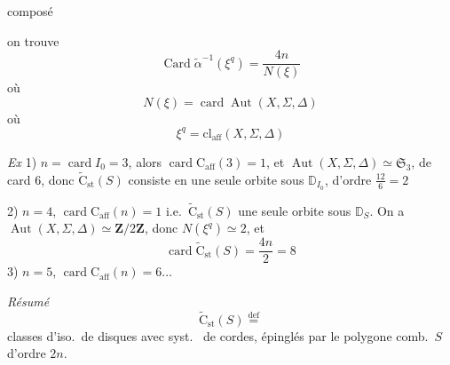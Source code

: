 \documentclass[11pt,a4paper]{article}
\begin{document}
  composé


on trouve
\[
\operatorname{Card} \widetilde{\alpha}^{-1}(\xi^{q}) = \frac{4n}{N(\xi)}
\]
où
\[
N(\xi) = \operatorname{card} \operatorname{Aut}(X, \Sigma, \Delta)
\]
où
\[
\xi^{q} = \mathrm{cl}_{\mathrm{aff}}(X, \Sigma, \Delta)
\]

\emph{Ex} 1) $n = \operatorname{card} I_0 = 3$, alors  $\operatorname{card} \mathrm{C}_{\mathrm{aff}}(3) = 1$, et $\operatorname{Aut}(X, \Sigma, \Delta) \simeq \mathfrak{S}_3$, de card $6$, donc $\widetilde{\mathrm{C}}_{\mathrm{st}}(S)$ consiste en une seule orbite sous $\mathbb{D}_{I_0}$, d'ordre $\frac{12}{6} = 2$

2) $n = 4$, $\operatorname{card} \mathrm{C}_{\mathrm{aff}}(n) = 1$ i.e.\ $\widetilde{\mathrm{C}}_{\mathrm{st}}(S)$ une seule orbite sous $\mathbb{D}_S$. \struck{\ill{}} On a $\operatorname{Aut}(X, \Sigma, \Delta) \simeq \mathbf{Z}/2\mathbf{Z}$, donc $N(\xi^{q}) \simeq 2$, et
\[
\operatorname{card} \widetilde{\mathrm{C}}_{\mathrm{st}}(S) = \frac{4n}{2} = 8
\]
3) $n = 5$, $\operatorname{card} \mathrm{C}_{\mathrm{aff}}(n) = 6 \ldots$

\emph{Résumé}
\[
\widetilde{\mathrm{C}}_{\mathrm{st}}(S) \overset{\mathrm{def}}{=}
\]
classes d'iso.\ de disques avec syst.\  de cordes, épinglés par le polygone comb.\ $S$ d'ordre $2n$.
\end{document}
